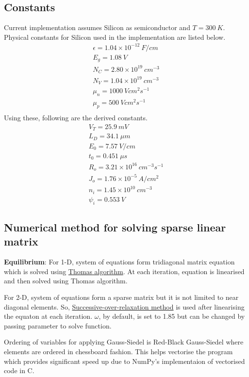 \subsection{Constants}
Current implementation assumes Silicon as semiconductor and $T = 300\ K$. Physical constants for Silicon used in the implementation are listed below.
\begin{align*}
\epsilon = 1.04 \times 10^{-12}\ F/cm \\
E_g = 1.08\ V \\
N_C = 2.80 \times 10^{19}\ cm^{-3}\\
N_V = 1.04 \times 10^{19}\ cm^{-3} \\
\mu_n = 1000\ V cm^2 s^{-1}  \\
\mu_p = 500\ V cm^2 s^{-1}  \\
\tag{3.1} \label{eq:36} 
\end{align*}
Using these, following are the derived constants.
\begin{align*}
V_T = 25.9\ mV \\
L_D = 34.1\ \mu m \\
E_0 = 7.57\ V/cm \\
t_0 = 0.451\ \mu s \\
R_o = 3.21 \times 10^{16}\ cm^{-3}s^{-1}\\
J_o = 1.76 \times 10^{-5} \ A/cm^2 \\
n_i = 1.45 \times 10^{10}\ cm^{-3} \\
\psi_i = 0.553\ V 
\tag{3.2} \label{eq:37} 
\end{align*}

\subsection{Numerical method for solving sparse linear matrix}
\textbf{Equilibrium}:
For 1-D, system of equations form tridiagonal matrix equation which is solved using \href{https://en.wikipedia.org/wiki/Tridiagonal_matrix_algorithm}{Thomas algorithm}. At each iteration, equation is linearised and then solved using Thomas algorithm.  

For 2-D, system of equations form a sparse matrix but it is not limited to near diagonal elements. So, \href{https://en.wikipedia.org/wiki/successive-over-relaxation} {Successive-over-relaxation method} is used after linearising the equaton at each iteration. $\omega$, by default, is set to 1.85 but can be changed by passing parameter to solve function.

Ordering of variables for applying Gauss-Siedel is Red-Black Gauss-Siedel where elements are ordered in chessboard fashion. This helps vectorise the program which provides significant speed up due to NumPy's implementaion of vectorised code in C. 

